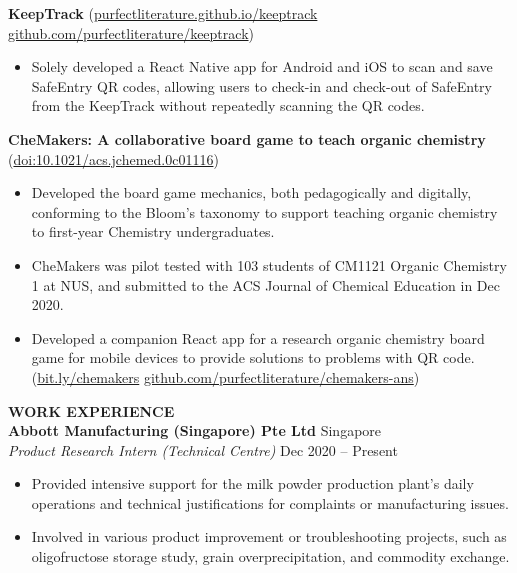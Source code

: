 \documentclass[a4paper, 11pt]{article}
\newcommand{\intraspace}{\vspace{5pt}}
\begin{document}
	\intraspace
	
	\textbf{KeepTrack} (\href{https://purfectliterature.github.io/keeptrack/}{purfectliterature.github.io/keeptrack} \textbar\space \href{https://github.com/purfectliterature/keeptrack}{github.com/purfectliterature/keeptrack})
	\begin{itemize}[leftmargin=*, noitemsep, topsep=0pt]
		\item Solely developed a React Native app for Android and iOS to scan and save SafeEntry QR codes, allowing users to check-in and check-out of SafeEntry from the KeepTrack without repeatedly scanning the QR codes.
	\end{itemize}

	\intraspace
	
	\textbf{CheMakers: A collaborative board game to teach organic chemistry} (\href{https://pubs.acs.org/doi/abs/10.1021/acs.jchemed.0c01116}{doi:10.1021/acs.jchemed.0c01116})
	\begin{itemize}[leftmargin=*, noitemsep, topsep=0pt]
		\item Developed the board game mechanics, both pedagogically and digitally, conforming to the Bloom's taxonomy to support teaching organic chemistry to first-year Chemistry undergraduates.
		\item CheMakers was pilot tested with 103 students of CM1121 Organic Chemistry 1 at NUS, and submitted to the ACS Journal of Chemical Education in Dec 2020.
		\item Developed a companion React app for a research organic chemistry board game for mobile devices to provide solutions to problems with QR code. (\href{http://bit.ly/chemakers}{bit.ly/chemakers} \textbar\space \href{http://github.com/purfectliterature/chemakers-ans}{github.com/purfectliterature/chemakers-ans})
	\end{itemize}
	
	\pagebreak
	
	\textbf{\large WORK EXPERIENCE} \hrulefill \\
	\textbf{Abbott Manufacturing (Singapore) Pte Ltd} \hfill Singapore\\
	\textit{Product Research Intern (Technical Centre)} \hfill Dec 2020 -- Present
	\begin{itemize}[leftmargin=*, noitemsep, topsep=0pt]
		\item Provided intensive support for the milk powder production plant's daily operations and technical justifications for complaints or manufacturing issues.
		\item Involved in various product improvement or troubleshooting projects, such as oligofructose storage study, grain overprecipitation, and commodity exchange.
	\end{itemize}
	
\end{document}
